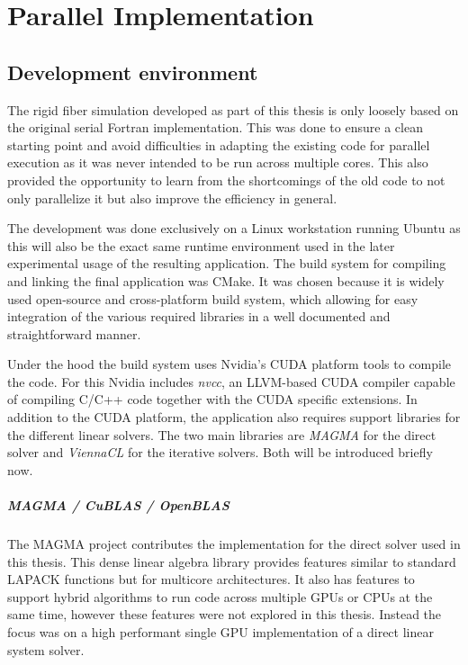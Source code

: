 \documentclass[a4paper,11pt]{kth-mag}
\begin{document}
\chapter{Parallel Implementation}

\section{Development environment}

The rigid fiber simulation developed as part of this thesis is only loosely based on the original serial Fortran implementation. This was done to ensure a clean starting point and avoid difficulties in adapting the existing code for parallel execution as it was never intended to be run across multiple cores. This also provided the opportunity to learn from the shortcomings of the old code to not only parallelize it but also improve the efficiency in general.

The development was done exclusively on a Linux workstation running Ubuntu as this will also be the exact same runtime environment used in the later experimental usage of the resulting application. The build system for compiling and linking the final application was CMake. It was chosen because it is widely used open-source and cross-platform build system, which allowing for easy integration of the various required libraries in a well documented and straightforward manner.

Under the hood the build system uses Nvidia's CUDA platform tools to compile the code. For this Nvidia includes \emph{nvcc}, an LLVM-based CUDA compiler capable of compiling C/C++ code together with the CUDA specific extensions. In addition to the CUDA platform, the application also requires support libraries for the different linear solvers. The two main libraries are \emph{MAGMA} for the direct solver and \emph{ViennaCL} for the iterative solvers. Both will be introduced briefly now.

\paragraph{MAGMA / CuBLAS / OpenBLAS}
The MAGMA project contributes the implementation for the direct solver used in this thesis. This dense linear algebra library provides features similar to standard LAPACK functions but for multicore architectures. It also has features to support hybrid algorithms to run code across multiple GPUs or CPUs at the same time, however these features were not explored in this thesis. Instead the focus was on a high performant single GPU implementation of a direct linear system solver.
\end{document}
